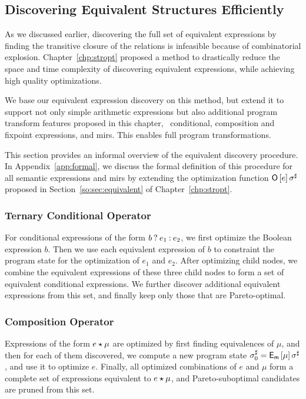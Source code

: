 \subsection{Discovering Equivalent Structures Efficiently}
\label{po:sub:discovering}

As we discussed earlier, discovering the full set of equivalent expressions
by finding the transitive closure of the relations is infeasible because
of combinatorial explosion.  Chapter~\ref{chp:stropt} proposed a method to
drastically reduce the space and time complexity of discovering equivalent
expressions, while achieving high quality optimizations.

We base our equivalent expression discovery on this method, but extend it to
support not only simple arithmetic expressions but also additional program
transform features proposed in this chapter, \ie~conditional, composition
and fixpoint expressions, and \glspl{mir}.  This enables full program
transformations.

This section provides an informal overview of the equivalent discovery
procedure.  In Appendix~\ref{app:formal}, we discuss the formal definition
of this procedure for all semantic expressions and \glspl{mir} by
extending the optimization function $\operatorname{\mathsf{O}}\left[e\right]\sigma^\sharp$ proposed in
Section~\ref{so:sec:equivalent} of Chapter~\ref{chp:stropt}.

\subsubsection{Ternary Conditional Operator}

For conditional expressions of the form $b\mathbin{?} e_1\mathbin{:} e_2$, we first
optimize the Boolean expression $b$.  Then we use each equivalent expression of
$b$ to constraint the program state for the optimization of $e_1$ and $e_2$.
After optimizing child nodes, we combine the equivalent expressions of these
three child nodes to form a set of equivalent conditional expressions.  We
further discover additional equivalent expressions from this set, and finally
keep only those that are Pareto-optimal.

\subsubsection{Composition Operator}

Expressions of the form $e \mathbin{\star} \mu$ are optimized by first finding
equivalences of $\mu$, and then for each of them discovered, we compute a
new program state $\sigma^\sharp_0 = \operatorname{\mathsf{E}_\mathsf{m}}\left[{\mu}\right] \sigma^\sharp$, and
use it to optimize $e$.  Finally, all optimized combinations of $e$ and
$\mu$ form a complete set of expressions equivalent to $e \mathbin{\star} \mu$, and
Pareto-suboptimal candidates are pruned from this set.

